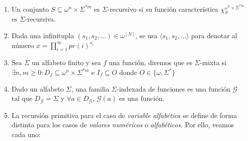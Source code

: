 \documentclass[
]{article}
\providecommand{\tightlist}{%
  \setlength{\itemsep}{0pt}\setlength{\parskip}{0pt}}
\begin{document}
\begin{enumerate}
\def\labelenumi{\arabic{enumi}.}
\tightlist
\item
  Un conjunto \(S\subseteq\omega^n\times\Sigma^{*m}\) es
  \(\Sigma\)-recursivo si su función característica
  \(\chi_S^{\omega^n\times\Sigma^{*m}}\) es \(\Sigma\)-recursiva.
\item
  Dada una infinitupla \((s_1,s_2,...)\in\omega^{[N]}\), se usa
  \(\langle s_1,s_2,...\rangle\) para denotar al número
  \(x=\prod_{i=1}^\infty pr(i)^{s_i}\)
\item
  Sea \(\Sigma\) un alfabeto finito y sea \(f\) una función, diremos que
  es \(\Sigma\)-mixta si
  \(\exists n,m\geq 0:D_f\subseteq\omega^n\times\Sigma^{*m}\) e
  \(I_f\subseteq O\) donde \(O\in\{\omega,\Sigma^*\}\)
\item
  Dado un alfabeto \(\Sigma\), una familia \(\Sigma\)-indexada de
  funciones es una función \(\mathcal{G}\) tal que
  \(D_\mathcal{G}=\Sigma\) y \(\forall a\in D_\mathcal{G}\),
  \(\mathcal{G}(a)\) es una función.
\item
  La recursión primitiva para el caso de \emph{variable alfabética} se
  define de forma distinta para los casos de \emph{valores numéricos} o
  \emph{alfabéticos}. Por ello, veamos cada uno:


\end{enumerate}
\end{document}
